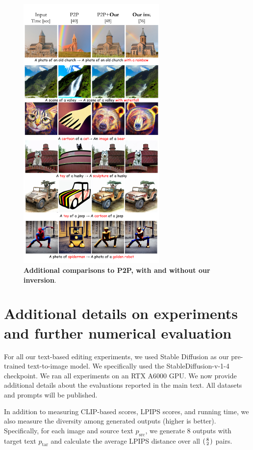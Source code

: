 \clearpage


\begin{figure}
\centering
\includegraphics[width=0.65\textwidth]{ICCV23_submission/figures/p2p_2.pdf}
\caption{\textbf{Additional comparisons to P2P, with and without our inversion}. }
\label{fig:p2p_2}
\end{figure}

\clearpage

\clearpage
\section{Additional details on experiments and further numerical evaluation} 
\label{app:AdditionalDetails}
For all our text-based editing experiments, we used Stable Diffusion as our pre-trained text-to-image model. We specifically used the StableDiffusion-v-1-4 checkpoint. We ran all experiments on an RTX A6000 GPU. We now provide additional details about the evaluations reported in the main text. All datasets and prompts will be published.

In addition to measuring CLIP-based scores, LPIPS scores, and running time, we also measure the diversity among generated outputs (higher is better). Specifically, for each image and source text $p_{\text{src}}$, we generate 8 outputs with target text $p_{\text{tar}}$ and calculate the average LPIPS distance over all $\begin{psmallmatrix}8\\2\end{psmallmatrix}$ pairs.

